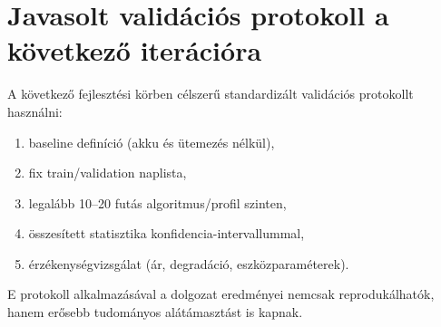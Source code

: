\section{Javasolt validációs protokoll a következő iterációra}
A következő fejlesztési körben célszerű standardizált validációs protokollt használni:
\begin{enumerate}
  \item baseline definíció (akku és ütemezés nélkül),
  \item fix train/validation naplista,
  \item legalább 10--20 futás algoritmus/profil szinten,
  \item összesített statisztika konfidencia-intervallummal,
  \item érzékenységvizsgálat (ár, degradáció, eszközparaméterek).
\end{enumerate}

E protokoll alkalmazásával a dolgozat eredményei nemcsak reprodukálhatók, hanem erősebb tudományos alátámasztást is kapnak.
